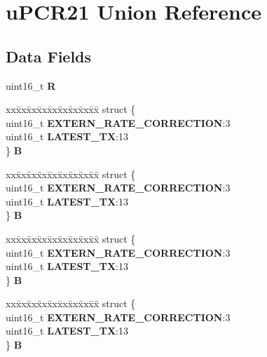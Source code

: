 \hypertarget{unionuPCR21}{}\section{u\+P\+C\+R21 Union Reference}
\label{unionuPCR21}
\subsection*{Data Fields}
\begin{DoxyCompactItemize}
\item 
\mbox{\label{unionuPCR21_a5e07302a167137860bd4a155d73a0f0f}} 
uint16\+\_\+t {\bfseries R}
\item 
\mbox{\label{unionuPCR21_ac8530b7ed19f7a87c5274e975d014907}} 
\begin{tabbing}
xx\=xx\=xx\=xx\=xx\=xx\=xx\=xx\=xx\=\kill
struct \{\\
\>uint16\_t {\bfseries EXTERN\_RATE\_CORRECTION}:3\\
\>uint16\_t {\bfseries LATEST\_TX}:13\\
\} {\bfseries B}\\

\end{tabbing}\item 
\mbox{\label{unionuPCR21_aacd3f50704e2a93fa3c64f1c23c5bbed}} 
\begin{tabbing}
xx\=xx\=xx\=xx\=xx\=xx\=xx\=xx\=xx\=\kill
struct \{\\
\>uint16\_t {\bfseries EXTERN\_RATE\_CORRECTION}:3\\
\>uint16\_t {\bfseries LATEST\_TX}:13\\
\} {\bfseries B}\\

\end{tabbing}\item 
\mbox{\label{unionuPCR21_a2137c8ea569333ed570ceb67733bc69c}} 
\begin{tabbing}
xx\=xx\=xx\=xx\=xx\=xx\=xx\=xx\=xx\=\kill
struct \{\\
\>uint16\_t {\bfseries EXTERN\_RATE\_CORRECTION}:3\\
\>uint16\_t {\bfseries LATEST\_TX}:13\\
\} {\bfseries B}\\

\end{tabbing}\item 
\mbox{\label{unionuPCR21_a2ed8e5bb741588703a58c7be76eb3a00}} 
\begin{tabbing}
xx\=xx\=xx\=xx\=xx\=xx\=xx\=xx\=xx\=\kill
struct \{\\
\>uint16\_t {\bfseries EXTERN\_RATE\_CORRECTION}:3\\
\>uint16\_t {\bfseries LATEST\_TX}:13\\
\} {\bfseries B}\\

\end{tabbing}\end{DoxyCompactItemize}
